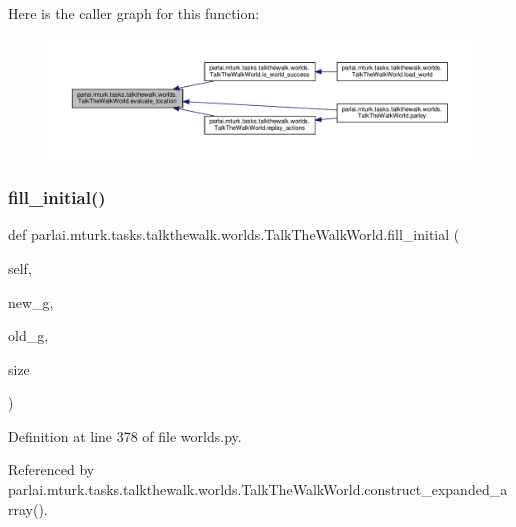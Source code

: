 Here is the caller graph for this function\+:
\nopagebreak
\begin{figure}[H]
\begin{center}
\leavevmode
\includegraphics[width=350pt]{classparlai_1_1mturk_1_1tasks_1_1talkthewalk_1_1worlds_1_1TalkTheWalkWorld_a02bbcb1c7fb2301308620a9844427112_icgraph}
\end{center}
\end{figure}
\mbox{\label{classparlai_1_1mturk_1_1tasks_1_1talkthewalk_1_1worlds_1_1TalkTheWalkWorld_adcba21d8dd2fd552fc3c7c777e704397}} 
\subsubsection{\texorpdfstring{fill\+\_\+initial()}{fill\_initial()}}
{\footnotesize\ttfamily def parlai.\+mturk.\+tasks.\+talkthewalk.\+worlds.\+Talk\+The\+Walk\+World.\+fill\+\_\+initial (\begin{DoxyParamCaption}\item[{}]{self,  }\item[{}]{new\+\_\+g,  }\item[{}]{old\+\_\+g,  }\item[{}]{size }\end{DoxyParamCaption})}



Definition at line 378 of file worlds.\+py.



Referenced by parlai.\+mturk.\+tasks.\+talkthewalk.\+worlds.\+Talk\+The\+Walk\+World.\+construct\+\_\+expanded\+\_\+array().


